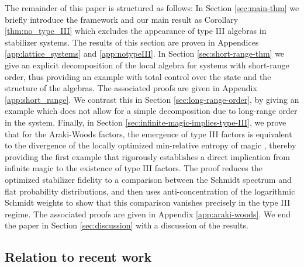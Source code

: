 \documentclass[aps,pra,reprint,superscriptaddress]{revtex4-2}
\theoremstyle{definition}
\theoremstyle{remark}
\begin{document}
The remainder of this paper is structured as follows: In Section \ref{sec:main-thm} we briefly introduce the framework and our main result as Corollary \ref{thm:no_type_III} which excludes the appearance of type III algebras in stabilizer systems. The results of this section are proven in Appendices \ref{app:lattice_systems} and \ref{app:notypeIII}. In Section \ref{sec:short-range-thm} we give an explicit decomposition of the local algebra for systems with short-range order, thus providing an example with total control over the state and the structure of the algebras. The associated proofs are given in Appendix \ref{app:short_range}. We contrast this in Section \ref{sec:long-range-order}, by giving an example which does not allow for a simple decomposition due to long-range order in the system. Finally, in Section \ref{sec:infinite-magic-implies-type-III}, we prove that for the Araki-Woods factors, the emergence of type III factors is equivalent to the divergence of the locally optimized min-relative entropy of magic \cite{Liu:2020yso}, thereby providing the first example that rigorously establishes a direct implication from infinite magic to the existence of type III factors. The proof reduces the optimized stabilizer fidelity to a comparison between the Schmidt spectrum and flat probability distributions, and then uses anti-concentration of the logarithmic Schmidt weights to show that this comparison vanishes precisely in the type III regime. The associated proofs are given in Appendix \ref{app:araki-woods}. We end the paper in Section \ref{sec:discussion} with a discussion of the results.

\subsection{Relation to recent work} 
\end{document}
